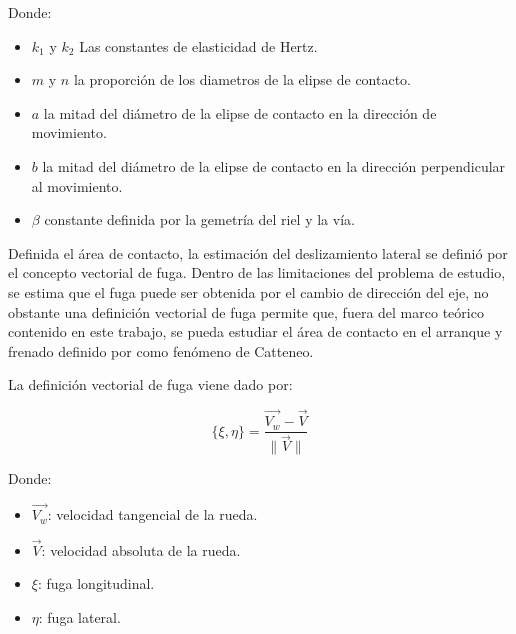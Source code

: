 \documentclass[main]{subfiles}
\begin{document}
\par \hspace{2cm}
\begin{minipage}{8cm}
\begin{spacing}{0.5}
Donde:
\begin{itemize}
\item $k_1$ y $k_2$ Las constantes de elasticidad de Hertz.
\item $m$ y $n$ la proporción de los diametros de la elipse de contacto.
\item $a$ la mitad del diámetro de la elipse de contacto en la dirección de movimiento.
\item $b$ la mitad del diámetro de la elipse de contacto en la dirección perpendicular al movimiento.
\item $\beta$ constante definida por la gemetría del riel y la vía.
\end{itemize}
\end{spacing}
\end{minipage}

Definida el área de contacto, la estimación del deslizamiento lateral se definió por el concepto vectorial de fuga. Dentro de las limitaciones del problema de estudio, se estima que el fuga puede ser obtenida por el cambio de dirección del eje, no obstante una definición vectorial de fuga permite que, fuera del marco teórico contenido en este trabajo, se pueda estudiar el área de contacto en el arranque y frenado definido por \citet{Kalker1991243} como fenómeno de Catteneo. 

La definición vectorial de fuga viene dado por:


\begin{equation}
\{ \xi,\eta\}=\frac{\vec{V_w}-\vec{V}}{\|\vec{V}\|}
\end{equation}

\par \hspace{2cm}
\begin{minipage}{8cm}
\begin{spacing}{0.5}
Donde:
\begin{itemize}
\item $\vec{V_w}$: velocidad tangencial de la rueda.
\item $\vec{V}$: velocidad absoluta de la rueda.
\item $ \xi$: fuga longitudinal.
\item $\eta$: fuga lateral.
\end{itemize}
\end{spacing}
\end{minipage}
\end{document}
